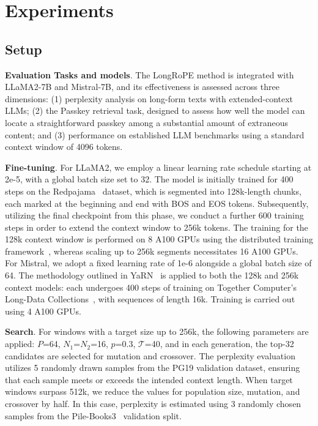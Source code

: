  \section{Experiments}

\subsection{Setup}
\textbf{Evaluation Tasks and models}. The LongRoPE method is integrated with LLaMA2-7B and Mistral-7B, and its effectiveness is assessed across three dimensions: (1) perplexity analysis on long-form texts with extended-context LLMs; (2) the Passkey retrieval task, designed to assess how well the model can locate a straightforward passkey among a substantial amount of extraneous content; and (3) performance on established LLM benchmarks using a standard context window of 4096 tokens.

\textbf{Fine-tuning}. For LLaMA2, we employ a linear learning rate schedule starting at 2e-5, with a global batch size set to 32. The model is initially trained for 400 steps on the Redpajama~\cite{redpajama} dataset, which is segmented into 128k-length chunks, each marked at the beginning and end with BOS and EOS tokens. Subsequently, utilizing the final checkpoint from this phase, we conduct a further 600 training steps in order to extend the context window to 256k tokens. The training for the 128k context window is performed on 8 A100 GPUs using the distributed training framework~\cite{cube}, whereas scaling up to 256k segments necessitates 16 A100 GPUs. For Mistral, we adopt a fixed learning rate of 1e-6 alongside a global batch size of 64. The methodology outlined in YaRN~\cite{yarn} is applied to both the 128k and 256k context models: each undergoes 400 steps of training on Together Computer's Long-Data Collections~\cite{mistraldata}, with sequences of length 16k. Training is carried out using 4 A100 GPUs.

\textbf{Search}. For windows with a target size up to 256k, the following parameters are applied: $P$=64, $N_1$=$N_2$=16, $p$=0.3, $\mathcal{T}$=40, and in each generation, the top-32 candidates are selected for mutation and crossover. The perplexity evaluation utilizes 5 randomly drawn samples from the PG19 validation dataset, ensuring that each sample meets or exceeds the intended context length. When target windows surpass 512k, we reduce the values for population size, mutation, and crossover by half. In this case, perplexity is estimated using 3 randomly chosen samples from the Pile-Books3~\cite{pile} validation split.

